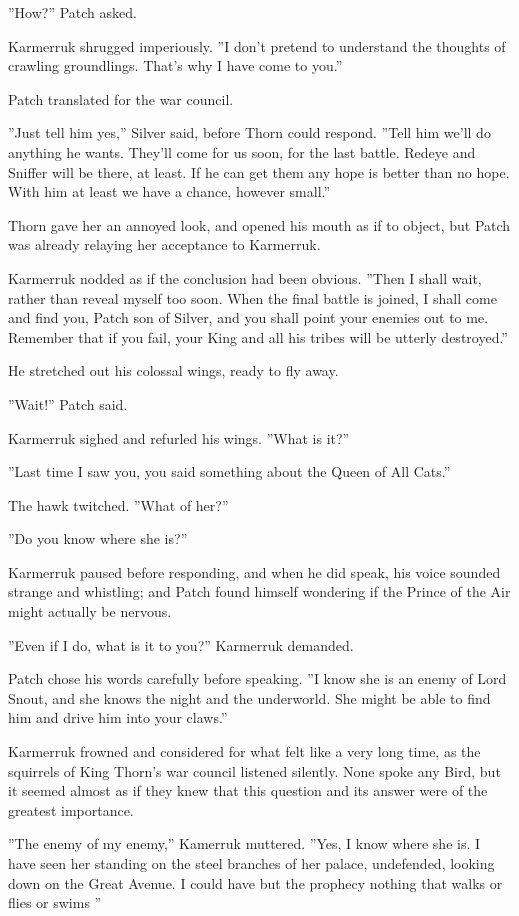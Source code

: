\documentclass[12pt]{book}
\begin{document}
''How?'' Patch asked.

Karmerruk shrugged imperiously. ''I don't pretend to understand the thoughts of crawling groundlings. That's why I have come to you.''

Patch translated for the war council.

''Just tell him yes,'' Silver said, before Thorn could respond. ''Tell him we'll do anything he wants. They'll come for us soon, for the last battle. Redeye and Sniffer will be there, at least. If he can get them %
any hope is better than no hope. With him at least we have a chance, however small.''

Thorn gave her an annoyed look, and opened his mouth as if to object, but Patch was already relaying her acceptance to Karmerruk.

Karmerruk nodded as if the conclusion had been obvious. ''Then I shall wait, rather than reveal myself too soon. When the final battle is joined, I shall come and find you, Patch son of Silver, and you shall point your enemies out to me. Remember that if you fail, your King and all his tribes will be utterly destroyed.''

He stretched out his colossal wings, ready to fly away.

''Wait!'' Patch said.

Karmerruk sighed and refurled his wings. ''What is it?''

''Last time I saw you, you said something about the Queen of All Cats.''

The hawk twitched. ''What of her?''

''Do you know where she is?''

Karmerruk paused before responding, and when he did speak, his voice sounded strange and whistling; and Patch found himself wondering if the Prince of the Air might actually be nervous.

''Even if I do, what is it to you?'' Karmerruk demanded.

Patch chose his words carefully before speaking. ''I know she is an enemy of Lord Snout, and she knows the night and the underworld. She might be able to find him and drive him into your claws.''

Karmerruk frowned and considered for what felt like a very long time, as the squirrels of King Thorn's war council listened silently. None spoke any Bird, but it seemed almost as if they knew that this question and its answer were of the greatest importance.

''The enemy of my enemy,'' Kamerruk muttered. ''Yes, I know where she is. I have seen her standing on the steel branches of her palace, undefended, looking down on the Great Avenue. I could have %
but the prophecy %
nothing that walks or flies or swims%
''
\end{document}

